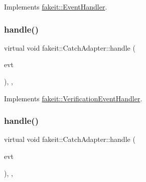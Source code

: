 Implements \mbox{\hyperlink{structfakeit_1_1EventHandler_a4de5ad05e5de73e36f4b2cede6d8efd3}{fakeit\+::\+Event\+Handler}}.

\mbox{\label{classfakeit_1_1CatchAdapter_ab4108a6770a6f02082e7662dbf4b836c}} 
\subsubsection{\texorpdfstring{handle()}{handle()}\hspace{0.1cm}{\footnotesize\ttfamily [2/6]}}
{\footnotesize\ttfamily virtual void fakeit\+::\+Catch\+Adapter\+::handle (\begin{DoxyParamCaption}\item[{const \mbox{\hyperlink{structfakeit_1_1SequenceVerificationEvent}{Sequence\+Verification\+Event}} \&}]{evt }\end{DoxyParamCaption})\hspace{0.3cm}{\ttfamily [inline]}, {\ttfamily [override]}, {\ttfamily [virtual]}}



Implements \mbox{\hyperlink{structfakeit_1_1VerificationEventHandler_adf355a9888bc2bf78ce0e1219bfb1379}{fakeit\+::\+Verification\+Event\+Handler}}.

\mbox{\label{classfakeit_1_1CatchAdapter_a44c05bbd7a09c63f357ef94345d085f5}} 
\subsubsection{\texorpdfstring{handle()}{handle()}\hspace{0.1cm}{\footnotesize\ttfamily [3/6]}}
{\footnotesize\ttfamily virtual void fakeit\+::\+Catch\+Adapter\+::handle (\begin{DoxyParamCaption}\item[{const \mbox{\hyperlink{structfakeit_1_1NoMoreInvocationsVerificationEvent}{No\+More\+Invocations\+Verification\+Event}} \&}]{evt }\end{DoxyParamCaption})\hspace{0.3cm}{\ttfamily [inline]}, {\ttfamily [override]}, {\ttfamily [virtual]}}



